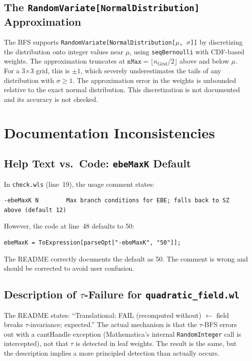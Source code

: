 \documentclass[12pt,a4paper]{article}
\theoremstyle{critical}
\theoremstyle{remark}
\begin{document}
\subsection{The \texttt{RandomVariate[NormalDistribution]} Approximation}

The BFS supports \texttt{RandomVariate[NormalDistribution[$\mu$, $\sigma$]]} by
discretizing the distribution onto integer values near $\mu$, using
\texttt{seqBernoulli} with CDF-based weights. The approximation truncates at
$\texttt{nMax} = \lfloor n_\text{Grid}/2 \rfloor$ above and below $\mu$. For a 3×3
grid, this is $\pm 1$, which severely underestimates the tails of any distribution with
$\sigma \geq 1$. The approximation error in the weights is unbounded relative to the
exact normal distribution. This discretization is not documented and its accuracy is not
checked.

\section{Documentation Inconsistencies}
\label{sec:doc}

\subsection{Help Text vs.\ Code: \texttt{ebeMaxK} Default}

In \texttt{check.wls} (line~19), the usage comment states:
\begin{lstlisting}
-ebeMaxK N        Max branch conditions for EBE; falls back to SZ above (default 12)
\end{lstlisting}
However, the code at line~48 defaults to 50:
\begin{lstlisting}
ebeMaxK = ToExpression[parseOpt["-ebeMaxK", "50"]];
\end{lstlisting}
The README correctly documents the default as 50. The comment is wrong and should be
corrected to avoid user confusion.

\subsection{Description of $\tau$-Failure for \texttt{quadratic\_field.wl}}

The README states: ``Translational: FAIL (recomputed without) $\leftarrow$ field breaks
$\tau$-invariance; expected.'' The actual mechanism is that the $\tau$-BFS errors out
with a cantHandle exception (Mathematica's internal \texttt{RandomInteger} call is
intercepted), not that $\tau$ is detected in leaf weights. The result is the same, but
the description implies a more principled detection than actually occurs.
\end{document}
